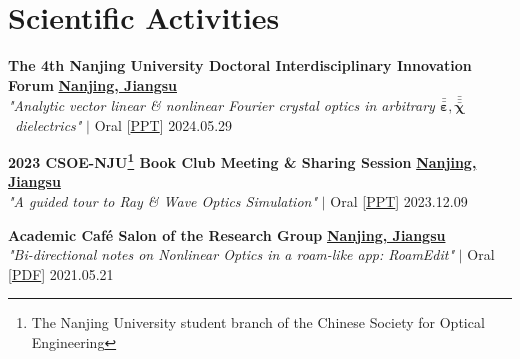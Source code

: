 
\section{Scientific Activities}
\begin{etaremune}[label={[\reversearabic*]},leftmargin=0.041\textwidth,itemsep=0pt]
	{\item \textbf{The 4th Nanjing University Doctoral Interdisciplinary Innovation Forum} \hfill \href{https://www.google.com/maps/place/\%E4\%B8\%AD\%E5\%9B\%BD\%E6\%B1\%9F\%E8\%8B\%8F\%E7\%9C\%81\%E5\%8D\%97\%E4\%BA\%AC\%E5\%B8\%82}{\textbf{Nanjing, Jiangsu}} \\ \textit{ "Analytic vector linear \& nonlinear Fourier crystal optics in arbitrary $\bar{\bar{\boldsymbol \varepsilon}}, \bar{\bar{\bar{\boldsymbol \chi}}}$ dielectrics"} $|$ {\color{color-detail} Oral} [\href{https://www.google.com/maps/place/\%E4\%B8\%AD\%E5\%9B\%BD\%E6\%B1\%9F\%E8\%8B\%8F\%E7\%9C\%81\%E5\%8D\%97\%E4\%BA\%AC\%E5\%B8\%82}{\small PPT}] \hfill 2024.05.29}
	{\item \textbf{2023 CSOE-NJU\footnote{The Nanjing University student branch of the Chinese Society for Optical Engineering} Book Club Meeting \& Sharing Session} \hfill \href{https://www.google.com/maps/place/\%E4\%B8\%AD\%E5\%9B\%BD\%E6\%B1\%9F\%E8\%8B\%8F\%E7\%9C\%81\%E5\%8D\%97\%E4\%BA\%AC\%E5\%B8\%82}{\textbf{Nanjing, Jiangsu}} \\ \textit{ "A guided tour to Ray \& Wave Optics Simulation"} $|$ {\color{color-detail} Oral} [\href{https://github.com/ChenZhu-Xie/PhD_academia/blob/master/2__Side_Projects/7.1__A_guided_tour_to_Ray_\%26_Wave_Optics_Simulation_\%E2\%86\%90_JavaScript\%2BPython__3.5_year_-_2023.12.9.pdf}{\small PPT}] \hfill 2023.12.09}
	{\item \textbf{Academic Café Salon of the Research Group} \hfill \href{https://www.google.com/maps/place/\%E4\%B8\%AD\%E5\%9B\%BD\%E6\%B1\%9F\%E8\%8B\%8F\%E7\%9C\%81\%E5\%8D\%97\%E4\%BA\%AC\%E5\%B8\%82}{\textbf{Nanjing, Jiangsu}} \\ \textit{ "Bi-directional notes on Nonlinear Optics in a roam-like app: RoamEdit"} $|$ {\color{color-detail} Oral} [\href{https://github.com/ChenZhu-Xie/postgraduate_academia/blob/main/2__Side_Projects/2.1__Reading_Club\%EF\%BC\%9ANotes_with_Bi-directional_Links_in_RoamEdit__1.0_year_-_2021.5.21.pdf}{\small PDF}] \hfill 2021.05.21}
	{\item[] }
\end{etaremune}

%	
%
%
